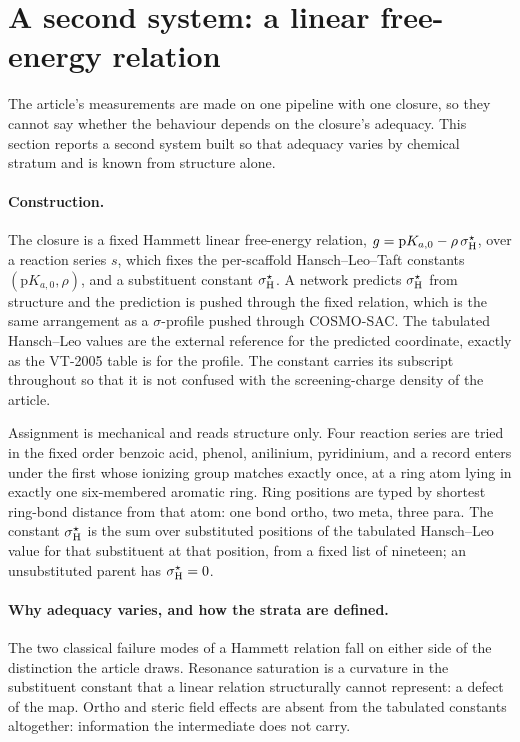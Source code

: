 \section{A second system: a linear free-energy relation}
\label{si:second}

The article's measurements are made on one pipeline with one closure, so they cannot say whether
the behaviour depends on the closure's adequacy. This section reports a second system built so
that adequacy varies by chemical stratum and is known from structure alone.

\paragraph{Construction.}
The closure is a fixed Hammett linear free-energy relation,
$g=\mathrm{p}K_{a,0}-\rho\,\sigma_{\mathrm H}^{\star}$, over a reaction series $s$, which fixes the
per-scaffold Hansch--Leo--Taft constants $(\mathrm{p}K_{a,0},\rho)$, and a substituent constant
$\sigma_{\mathrm H}^{\star}$. A network predicts $\sigma_{\mathrm H}^{\star}$ from structure and the prediction is
pushed through the fixed relation, which is the same arrangement as a $\sigma$-profile pushed
through COSMO-SAC. The tabulated Hansch--Leo values are the external reference for the predicted
coordinate, exactly as the VT-2005 table is for the profile. The constant carries its subscript
throughout so that it is not confused with the screening-charge density of the article.

Assignment is mechanical and reads structure only. Four reaction series are tried in the fixed
order benzoic acid, phenol, anilinium, pyridinium, and a record enters under the first whose
ionizing group matches exactly once, at a ring atom lying in exactly one six-membered aromatic
ring. Ring positions are typed by shortest ring-bond distance from that atom: one bond ortho, two
meta, three para. The constant $\sigma_{\mathrm H}^{\star}$ is the sum over substituted positions of the
tabulated Hansch--Leo value for that substituent at that position, from a fixed list of nineteen;
an unsubstituted parent has $\sigma_{\mathrm H}^{\star}=0$.

\paragraph{Why adequacy varies, and how the strata are defined.}
The two classical failure modes of a Hammett relation fall on either side of the distinction the
article draws. Resonance saturation is a curvature in the substituent constant that a linear
relation structurally cannot represent: a defect of the map. Ortho and steric field effects are
absent from the tabulated constants altogether: information the intermediate does not carry.

